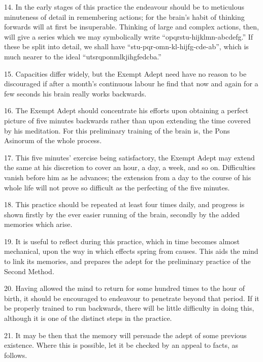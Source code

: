 \begin{sloppypar}
14. In the early stages of this practice the endeavour should be to meticulous minuteness of detail in remembering actions; for the brain’s habit of thinking forwards will at first be insuperable. Thinking of large and complex actions, then, will give a series which we may symbolically write \mbox{\enquote{opqrstu-hijklmn-abcdefg.}} If these be split into detail, we shall have \mbox{\enquote{stu-pqr-o\textendash{}mn-kl-hij\textendash{}fg-cde-ab}}, which is much nearer to the ideal \mbox{\enquote{utsrqponmlkjihgfedcba.}}
\end{sloppypar}

15. Capacities differ widely, but the Exempt Adept need have no reason to be discouraged if after a month’s continuous labour he find that now and again for a few seconds his brain really works backwards.

16. The Exempt Adept should concentrate his efforts upon obtaining a perfect picture of five minutes backwards rather than upon extending the time covered by his meditation. For this preliminary training of the brain is, the Pons Asinorum of the whole process.

17. This five minutes' exercise being satisfactory, the Exempt Adept may extend the same at his discretion to cover an hour, a day, a week, and so on. Difficulties vanish before him as he advances; the extension from a day to the course of his whole life will not prove so difficult as the perfecting of the five minutes.

18. This practice should be repeated at least four times  daily, and progress is shown firstly by the ever easier running of the brain, secondly by the added memories which arise.

19. It is useful to reflect during this practice, which in time becomes almost mechanical, upon the way in which effects spring from causes. This aids the mind to link its memories, and prepares the adept for the preliminary practice of the Second Method.

20. Having allowed the mind to return for some hundred times to the hour of birth, it should be encouraged to endeavour to penetrate beyond that period. If it be properly trained to run backwards, there will be little difficulty in doing this, although it is one of the distinct steps in the practice.

21. It may be then that the memory will persuade the adept of some previous existence. Where this is possible, let it be checked by an appeal to facts, as follows.

